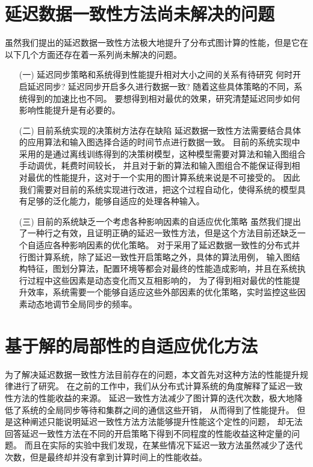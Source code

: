 \section{延迟数据一致性方法尚未解决的问题}
虽然我们提出的延迟数据一致性方法极大地提升了分布式图计算的性能，但是它在以下几个方面还存在着一系列尚未解决的问题。    
\begin{enumerate}      
  \item[(一)] 延迟同步策略和系统得到性能提升相对大小之间的关系有待研究 \newline\indent
    何时开启延迟同步? 延迟同步开启多久进行数据一致? 
    随着这些具体策略的不同，系统得到的加速比也不同。
    要想得到相对最优的效果，研究清楚延迟同步如何影响性能提升是有必要的。

  \item[(二)] 目前系统实现的决策树方法存在缺陷 \newline\indent
    延迟数据一致性方法需要结合具体的应用算法和输入图选择合适的时间节点进行数据一致。
    目前的系统实现中采用的是通过离线训练得到的决策树模型，这种模型需要对算法和输入图组合手动调优，耗费时间较长，
    并且对于新的算法和输入图组合不能保证得到相对最优的性能提升，这对于一个实用的图计算系统来说是不可接受的。
    因此我们需要对目前的系统实现进行改进，把这个过程自动化，使得系统的模型具有足够的泛化能力，能够自适应的处理各种输入。          

  \item[(三)] 目前的系统缺乏一个考虑各种影响因素的自适应优化策略 \newline\indent
    虽然我们提出了一种行之有效，且证明正确的延迟一致性方法，但是这个方法目前还缺乏一个自适应各种影响因素的优化策略。
    对于采用了延迟数据一致性的分布式并行图计算系统，除了延迟一致性开启策略之外，具体的算法用例，
    输入图结构特征，图划分算法，配置环境等都会对最终的性能造成影响，并且在系统执行过程中这些因素是动态变化而又互相影响的，
    为了得到相对最优的性能提升效率，系统需要一个能够自适应这些外部因素的优化策略，实时监控这些因素动态地调节全局同步的频率。          
\end{enumerate}
\section{基于解的局部性的自适应优化方法}
为了解决延迟数据一致性方法目前存在的问题，本文首先对这种方法的性能提升规律进行了研究。
在之前的工作中，我们从分布式计算系统的角度解释了延迟一致性方法的性能收益的来源。
延迟一致性方法减少了图计算的迭代次数，极大地降低了系统的全局同步等待和集群之间的通信这些开销，
从而得到了性能提升。
但是这种阐述只能说明延迟一致性方法方法能够提升性能这个定性的问题，
却无法回答延迟一致性方法在不同的开启策略下得到不同程度的性能收益这种定量的问题。
而且在实际的实验中我们发现，在某些情况下延迟一致方法虽然减少了迭代次数，但是最终却并没有拿到计算时间上的性能收益。

